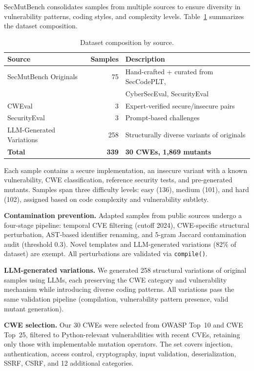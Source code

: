 \documentclass[sigconf,anonymous,review]{acmart}
\begin{document}
SecMutBench consolidates samples from multiple sources to ensure diversity in vulnerability patterns, coding styles, and complexity levels. Table~\ref{tab:dataset} summarizes the dataset composition.

\begin{table}[t]
\caption{Dataset composition by source.}
\label{tab:dataset}
\small
\begin{tabular}{lrl}
\toprule
\textbf{Source} & \textbf{Samples} & \textbf{Description} \\
\midrule
SecMutBench Originals & 75 & Hand-crafted + curated from SecCodePLT, \\
 & & CyberSecEval, SecurityEval \\
CWEval~\cite{yang2024cweval} & 3 & Expert-verified secure/insecure pairs \\
SecurityEval~\cite{siddiq2022securityeval} & 3 & Prompt-based challenges \\
LLM-Generated Variations & 258 & Structurally diverse variants of originals \\
\midrule
\textbf{Total} & \textbf{339} & \textbf{30 CWEs, 1,869 mutants} \\
\bottomrule
\end{tabular}
\end{table}


Each sample contains a secure implementation, an insecure variant with a known vulnerability, CWE classification, reference security tests, and pre-generated mutants. Samples span three difficulty levels: easy (136), medium (101), and hard (102), assigned based on code complexity and vulnerability subtlety.

\textbf{Contamination prevention.} Adapted samples from public sources undergo a four-stage pipeline: temporal CVE filtering (cutoff 2024), CWE-specific structural perturbation, AST-based identifier renaming, and 5-gram Jaccard contamination audit (threshold 0.3). Novel templates and LLM-generated variations (82\% of dataset) are exempt. All perturbations are validated via \texttt{compile()}.

\textbf{LLM-generated variations.} We generated 258 structural variations of original samples using LLMs, each preserving the CWE category and vulnerability mechanism while introducing diverse coding patterns. All variations pass the same validation pipeline (compilation, vulnerability pattern presence, valid mutant generation).

\textbf{CWE selection.} Our 30 CWEs were selected from OWASP Top~10 and CWE Top~25, filtered to Python-relevant vulnerabilities with recent CVEs, retaining only those with implementable mutation operators. The set covers injection, authentication, access control, cryptography, input validation, deserialization, SSRF, CSRF, and 12 additional categories.
\end{document}
